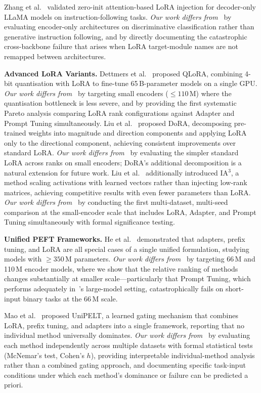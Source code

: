\documentclass[conference]{IEEEtran}
\begin{document}
Zhang et al.~\cite{zhang2023llamaadapter} validated zero-init attention-based LoRA injection for decoder-only LLaMA models on instruction-following tasks. \textit{Our work differs from~\cite{zhang2023llamaadapter}} by evaluating encoder-only architectures on discriminative classification rather than generative instruction following, and by directly documenting the catastrophic cross-backbone failure that arises when LoRA target-module names are not remapped between architectures.

\textbf{Advanced LoRA Variants.} Dettmers et al.~\cite{dettmers2023qlora} proposed QLoRA, combining 4-bit quantisation with LoRA to fine-tune 65\,B-parameter models on a single GPU. \textit{Our work differs from~\cite{dettmers2023qlora}} by targeting small encoders (${\leq}110$\,M) where the quantisation bottleneck is less severe, and by providing the first systematic Pareto analysis comparing LoRA rank configurations against Adapter and Prompt Tuning simultaneously. Liu et al.~\cite{liu2024dora} proposed DoRA, decomposing pre-trained weights into magnitude and direction components and applying LoRA only to the directional component, achieving consistent improvements over standard LoRA. \textit{Our work differs from~\cite{liu2024dora}} by evaluating the simpler standard LoRA across ranks on small encoders; DoRA's additional decomposition is a natural extension for future work. Liu et al.~\cite{liu2022fewshot} additionally introduced IA$^3$, a method scaling activations with learned vectors rather than injecting low-rank matrices, achieving competitive results with even fewer parameters than LoRA. \textit{Our work differs from~\cite{liu2022fewshot}} by conducting the first multi-dataset, multi-seed comparison at the small-encoder scale that includes LoRA, Adapter, and Prompt Tuning simultaneously with formal significance testing.

\textbf{Unified PEFT Frameworks.}
He et al.~\cite{he2022unified} demonstrated that adapters, prefix tuning, and LoRA are all special cases of a single unified formulation, studying models with ${\geq}350$\,M parameters. \textit{Our work differs from~\cite{he2022unified}} by targeting 66\,M and 110\,M encoder models, where we show that the relative ranking of methods changes substantially at smaller scale---particularly that Prompt Tuning, which performs adequately in~\cite{he2022unified}'s large-model setting, catastrophically fails on short-input binary tasks at the 66\,M scale.

Mao et al.~\cite{mao2022unipelt} proposed UniPELT, a learned gating mechanism that combines LoRA, prefix tuning, and adapters into a single framework, reporting that no individual method universally dominates. \textit{Our work differs from~\cite{mao2022unipelt}} by evaluating each method independently across multiple datasets with formal statistical tests (McNemar's test, Cohen's $h$), providing interpretable individual-method analysis rather than a combined gating approach, and documenting specific task-input conditions under which each method's dominance or failure can be predicted a priori.
\end{document}
